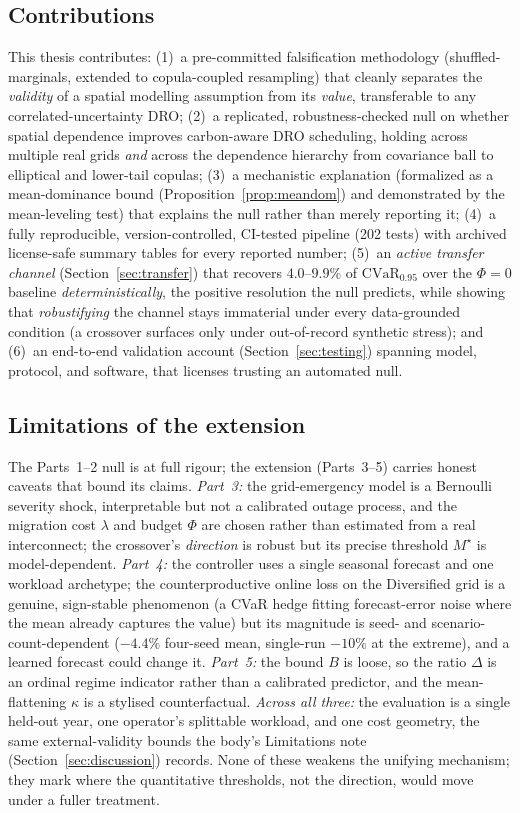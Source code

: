 \documentclass[12pt]{article}
\newcommand{\CVaR}{\mathrm{CVaR}}
\begin{document}
\subsection{Contributions}
This thesis contributes: (1)~a pre-committed falsification methodology
(shuffled-marginals, extended to copula-coupled resampling) that cleanly separates
the \emph{validity} of a spatial modelling assumption from its \emph{value},
transferable to any correlated-uncertainty DRO; (2)~a replicated,
robustness-checked null on whether spatial dependence improves carbon-aware DRO
scheduling, holding across multiple real grids \emph{and} across the dependence
hierarchy from covariance ball to elliptical and lower-tail copulas;
(3)~a mechanistic explanation (formalized as a mean-dominance bound
(Proposition~\ref{prop:meandom}) and demonstrated by the mean-leveling test) that
explains the null rather than merely reporting it; (4)~a fully reproducible,
version-controlled, CI-tested pipeline (202 tests) with archived license-safe
summary tables for every reported number; (5)~an \emph{active transfer channel}
(Section~\ref{sec:transfer}) that recovers $4.0$--$9.9\%$ of $\CVaR_{0.95}$ over the
$\Phi=0$ baseline \emph{deterministically}, the positive resolution the null predicts, while showing
that \emph{robustifying} the channel stays immaterial under every data-grounded
condition (a crossover surfaces only under out-of-record synthetic stress); and
(6)~an end-to-end validation account (Section~\ref{sec:testing}) spanning model,
protocol, and software, that licenses trusting an automated null.

\subsection{Limitations of the extension}
The Parts~1--2 null is at full rigour; the extension (Parts~3--5) carries honest
caveats that bound its claims. \emph{Part~3:} the grid-emergency model is a
Bernoulli severity shock, interpretable but not a calibrated outage process, and the
migration cost $\lambda$ and budget $\Phi$ are chosen rather than estimated from a
real interconnect; the crossover's \emph{direction} is robust but its precise
threshold $M^\star$ is model-dependent. \emph{Part~4:} the controller uses a single
seasonal forecast and one workload archetype; the counterproductive online loss on the
Diversified grid is a genuine, sign-stable phenomenon (a CVaR hedge fitting
forecast-error noise where the mean already captures the value) but its magnitude is
seed- and scenario-count-dependent ($-4.4\%$ four-seed mean, single-run $-10\%$ at the
extreme), and a learned forecast could change it. \emph{Part~5:} the
bound $B$ is loose, so the ratio $\Delta$ is an ordinal regime indicator rather than
a calibrated predictor, and the mean-flattening $\kappa$ is a stylised counterfactual.
\emph{Across all three:} the evaluation is a single held-out year, one operator's
splittable workload, and one cost geometry, the same external-validity bounds the
body's Limitations note (Section~\ref{sec:discussion}) records. None of these weakens
the unifying mechanism; they mark where the quantitative thresholds, not the
direction, would move under a fuller treatment.
\end{document}
